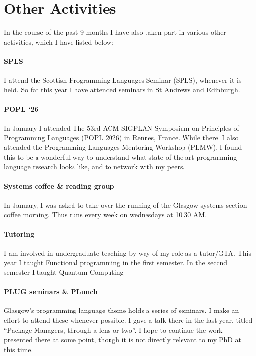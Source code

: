 
\section{Other Activities} \label{outreach}

In the course of the past 9 months I have also taken part in various
other activities, which I have listed below:

\paragraph{SPLS}
I attend the Scottish Programming Languages Seminar (SPLS), whenever it is held.
So far this year I have attended seminars in St Andrews and Edinburgh.

\paragraph{POPL `26}
In January I attended The 53rd ACM SIGPLAN Symposium on Principles of Programming Languages (POPL 2026) in Rennes, France. 
% 
While there, I also attended the Programming Languages Mentoring Workshop (PLMW).
% 
I found this to be a wonderful way to understand what state-of-the art programming language research looks like,
and to network with my peers.


\paragraph{Systems coffee \& reading group}
In January, I was asked to take over the running of the Glasgow systems section coffee morning.
Thus runs every week on wednesdays at 10:30 AM.

\paragraph{Tutoring}
I am involved in undergraduate teaching by way of my role as a tutor/GTA.
This year I taught Functional programming in the first semester. In the second semester I taught Quantum Computing

\paragraph{PLUG seminars \& PLunch}
Glasgow's programming language theme holds a series of seminars.
% 
I make an effort to attend these whenever possible. 
% 
I gave a talk there in the last year, titled ``Package Managers, through a lens or two''. 
% 
I hope to continue the work presented there at some point, though it is not directly relevant to my PhD at this time.


